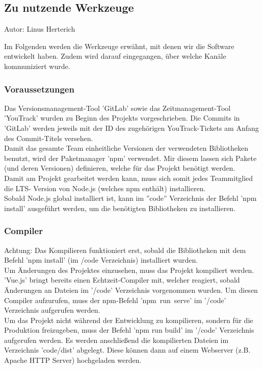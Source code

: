 \documentclass[twoside]{report}
\begin{document}
\subsection{Zu nutzende Werkzeuge}
{\small Autor: Linus Herterich}

Im Folgenden werden die Werkzeuge erwähnt, mit denen wir die Software
entwickelt haben. Zudem wird darauf eingegangen, über welche Kanäle kommuniziert
wurde.


\subsubsection{Voraussetzungen}
Das Versionsmanagement-Tool 'GitLab' sowie das Zeitmanagement-Tool 'YouTrack'
wurden zu Beginn des Projekts vorgeschrieben. Die Commits in 'GitLab' werden jeweils mit
der ID des zugehörigen YouTrack-Tickets am Anfang des Commit-Titels versehen.
\\Damit das gesamte Team einheitliche Versionen der verwendeten Bibliotheken benutzt,
wird der Paketmanager 'npm' verwendet. Mir diesem lassen sich Pakete (und deren Versionen) definieren,
welche für das Projekt benötigt werden.
\\ Damit am Projekt gearbeitet werden kann, muss sich somit jedes Teammitglied die LTS-
Version von Node.js (welches npm enthält) installieren.
\\ Sobald Node.js global installiert ist, kann im ''code'' Verzeichnis der Befehl
'npm install' ausgeführt werden, um die benötigten Bibliotheken zu installieren.

\subsubsection{Compiler}
Achtung: Das Kompilieren funktioniert erst, sobald die Bibliotheken mit dem Befehl
'npm install' (im /code Verzeichnis) installiert wurden.
\\
Um Änderungen des Projektes einzusehen, muss das Projekt kompiliert werden.
'Vue.js' bringt bereits einen Echtzeit-Compiler mit, welcher reagiert, sobald Änderungen
an Dateien im '/code' Verzeichnis vorgenommen wurden. Um diesen Compiler aufzurufen, muss der npm-Befehl \mbox{'npm run serve'} im '/code' Verzeichnis
aufgerufen werden.
\\Um das Projekt nicht während der Entwicklung zu kompilieren, sondern für die Produktion freizugeben,
muss der Befehl 'npm run build' im '/code' Verzeichnis aufgerufen werden. Es werden
anschließend die kompilierten Dateien im Verzeichnis 'code/dist' abgelegt.
Diese können dann auf einem Webserver (z.B. Apache HTTP Server) hochgeladen werden.
\end{document}
